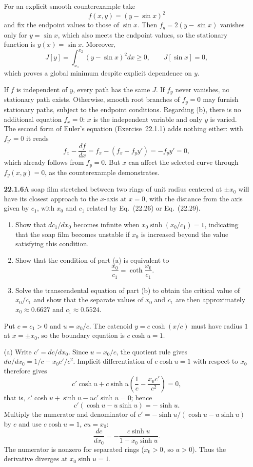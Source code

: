 For an explicit smooth counterexample take
\[
f(x,y)=(y-\sin x)^2
\]
and fix the endpoint values to those of $\sin x$. Then
$f_y=2(y-\sin x)$ vanishes only for $y=\sin x$, which also meets the
endpoint values, so the stationary function is
$\boxed{y(x)=\sin x}$. Moreover,
\[
J[y]=\int_{x_1}^{x_2}(y-\sin x)^2dx\ge0,\qquad
J[\sin x]=0,
\]
which proves a global minimum despite explicit dependence on $y$.

If $f$ is independent of $y$, every path has the same $J$.
If $f_y$ never vanishes, no stationary path exists. Otherwise, smooth
root branches of $f_y=0$ may furnish stationary paths, subject to the
endpoint conditions. Regarding (b), there is no additional equation
$f_x=0$: $x$ is the independent variable and only $y$ is varied. The
second form of Euler's equation (Exercise~22.1.1) adds nothing either:
with $f_{y'}=0$ it reads
\[
f_x-\frac{df}{dx}=f_x-(f_x+f_yy')=-f_yy'=0,
\]
which already follows from $f_y=0$. But $x$ can affect the
selected curve through $f_y(x,y)=0$, as the counterexample demonstrates.


\par\bigskip
\noindent\textbf{22.1.6}\quad A soap film stretched between two
rings of unit radius centered at $\pm x_{0}$ will have its closest
approach to the $x$-axis at $x=0$, with the distance from the
axis given by $c_{1}$, with $x_{0}$ and $c_{1}$ related by
Eq.~(22.26) or Eq.~(22.29).
\begin{enumerate}
\item[(a)] Show that $dc_{1}/dx_{0}$ becomes infinite when
$x_{0}\sinh(x_{0}/c_{1})=1$, indicating that the soap film
becomes unstable if $x_{0}$ is increased beyond the value
satisfying this condition.
\item[(b)] Show that the condition of part (a) is equivalent to
\[
\frac{x_{0}}{c_{1}}=\coth\frac{x_{0}}{c_{1}}.
\]
\item[(c)] Solve the transcendental equation of part (b) to
obtain the critical value of $x_{0}/c_{1}$ and show that the
separate values of $x_{0}$ and $c_{1}$ are then approximately
$x_{0}\approx0.6627$ and $c_{1}\approx0.5524$.
\end{enumerate}
\solution
Put $c=c_1>0$ and $u=x_0/c$. The catenoid $y=c\cosh(x/c)$ must have
radius $1$ at $x=\pm x_0$, so the boundary equation is
$c\cosh u=1$.

(a) Write $c'=dc/dx_0$. Since $u=x_0/c$, the quotient rule gives
$du/dx_0=1/c-x_0c'/c^2$. Implicit differentiation of $c\cosh u=1$
with respect to $x_0$ therefore gives
\[
c'\cosh u+c\sinh u
\left(\frac1c-\frac{x_0c'}{c^2}\right)=0,
\]
that is, $c'\cosh u+\sinh u-uc'\sinh u=0$; hence
\[
c'(\cosh u-u\sinh u)=-\sinh u.
\]
Multiply the numerator and denominator of
$c'=-\sinh u/(\cosh u-u\sinh u)$ by $c$ and use $c\cosh u=1$,
$cu=x_0$:
\[
\boxed{\frac{dc}{dx_0}=
-\frac{c\sinh u}{1-x_0\sinh u}}.
\]
The numerator is nonzero for separated rings ($x_0>0$, so $u>0$).
Thus the derivative diverges at $x_0\sinh u=1$.

